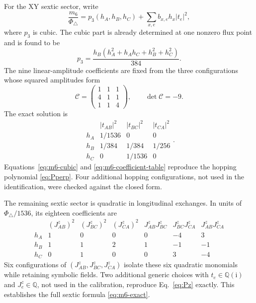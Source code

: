 \documentclass[11pt]{article}
\newcommand{\ii}{\mathrm{i}}
\newcommand{\PhiTri}{\Phi_\triangle}
\begin{document}
For the XY sextic sector, write
\begin{equation}
 \frac{m_6}{\PhiTri}=p_3(h_A,h_B,h_C)
 +\sum_{x,e}b_{x,e}h_x|t_e|^2,
 \label{eq:m6-ansatz}
\end{equation}
where $p_3$ is cubic.  The cubic part is already determined at one nonzero
flux point and is found to be
\begin{equation}
 p_3=\frac{h_B(h_A^2+h_Ah_C+h_B^2+h_C^2)}{384}.
 \label{eq:m6-cubic}
\end{equation}
The nine linear-amplitude coefficients are fixed from the three configurations
whose squared amplitudes form
\begin{equation}
 \mathcal C=
 \begin{pmatrix}
 1&1&1\\
 4&1&1\\
 1&1&4
 \end{pmatrix},
 \qquad \det\mathcal C=-9.
 \label{eq:calibration-matrix}
\end{equation}
The exact solution is
\begin{equation}
\begin{array}{c|ccc}
 &|t_{AB}|^2&|t_{BC}|^2&|t_{CA}|^2\\
\hline
h_A&1/1536&0&0\\
h_B&1/384&1/384&1/256\\
h_C&0&1/1536&0
\end{array}.
\label{eq:m6-coefficient-table}
\end{equation}
Equations~\eqref{eq:m6-cubic} and \eqref{eq:m6-coefficient-table} reproduce
the hopping polynomial \eqref{eq:Pperp}.  Four additional hopping
configurations, not used in the identification, were checked against the
closed form.

The remaining sextic sector is quadratic in longitudinal exchanges.  In
units of $\PhiTri/1536$, its eighteen coefficients are
\begin{equation}
\begin{array}{c|rrr|rrr}
 &(J_{AB}^z)^2&(J_{BC}^z)^2&(J_{CA}^z)^2
 &J_{AB}^zJ_{BC}^z&J_{BC}^zJ_{CA}^z&J_{AB}^zJ_{CA}^z\\
\hline
h_A&1&0&0&0&-4&3\\
h_B&1&1&2&1&-1&-1\\
h_C&0&1&0&0&3&-4
\end{array}
\label{eq:m6-Jz-table}
\end{equation}
Six configurations of $(J_{AB}^z,J_{BC}^z,J_{CA}^z)$ isolate these six
quadratic monomials while retaining symbolic fields.  Two additional generic
choices with $t_e\in\mathbb Q(\ii)$ and $J_e^z\in\mathbb Q$, not used in the
calibration, reproduce Eq.~\eqref{eq:Pz} exactly.  This establishes the full
sextic formula \eqref{eq:m6-exact}.
\end{document}

